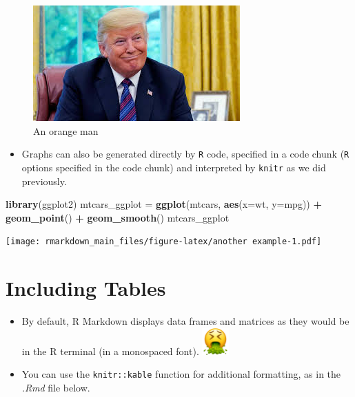 \documentclass[]{article}
\newenvironment{Shaded}{\begin{snugshade}}{\end{snugshade}}
\newcommand{\DataTypeTok}[1]{\textcolor[rgb]{0.13,0.29,0.53}{#1}}
\newcommand{\KeywordTok}[1]{\textcolor[rgb]{0.13,0.29,0.53}{\textbf{#1}}}
\newcommand{\NormalTok}[1]{#1}
\newcommand{\OperatorTok}[1]{\textcolor[rgb]{0.81,0.36,0.00}{\textbf{#1}}}
\newcommand{\StringTok}[1]{\textcolor[rgb]{0.31,0.60,0.02}{#1}}
\providecommand{\tightlist}{%
  \setlength{\itemsep}{0pt}\setlength{\parskip}{0pt}}
\begin{document}
\begin{figure}

{\centering \includegraphics[width=0.2\linewidth]{../figures/orange} 

}

\caption{An orange man}\label{fig:graphic_example}
\end{figure}

\begin{itemize}
\tightlist
\item
  Graphs can also be generated directly by \texttt{R} code, specified in
  a code chunk (\texttt{R} options specified in the code chunk) and
  interpreted by \texttt{knitr} as we did previously.
\end{itemize}

\begin{Shaded}
\begin{Highlighting}[]
\KeywordTok{library}\NormalTok{(ggplot2)}
\NormalTok{mtcars_ggplot =}\StringTok{ }\KeywordTok{ggplot}\NormalTok{(mtcars, }\KeywordTok{aes}\NormalTok{(}\DataTypeTok{x=}\NormalTok{wt, }\DataTypeTok{y=}\NormalTok{mpg)) }\OperatorTok{+}\StringTok{ }
\KeywordTok{geom_point}\NormalTok{() }\OperatorTok{+}\StringTok{ }\KeywordTok{geom_smooth}\NormalTok{()}
\NormalTok{mtcars_ggplot}
\end{Highlighting}
\end{Shaded}

\texttt{[image: rmarkdown\_main\_files/figure-latex/another example-1.pdf]}

\hypertarget{including-tables}{%
\section{Including Tables}\label{including-tables}}

\begin{itemize}
\item
  By default, R Markdown displays data frames and matrices as they would
  be in the R terminal (in a monospaced font).
  \includegraphics[width=0.40625in,height=\textheight]{../figures/vomit.png}
\item
  You can use the \texttt{knitr::kable} function for additional
  formatting, as in the \emph{.Rmd} file below.
\end{itemize}
\end{document}
